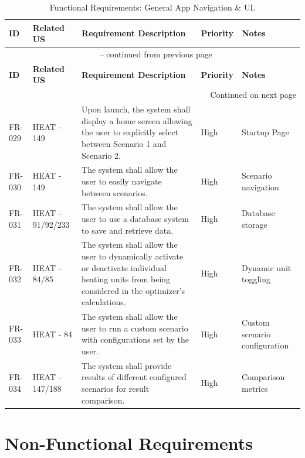 \begin{longtable}{|p{1.5cm}|p{2.4cm}|p{6.7cm}|p{1.4cm}|p{2cm}|}
\caption{Functional Requirements: General App Navigation \& UI.}
\label{tab:fr_general} \\
\hline
\textbf{ID} & \textbf{Related US} & \textbf{Requirement Description} & \textbf{Priority} & \textbf{Notes} \\
\hline
\endfirsthead

\multicolumn{5}{c}{{\tablename\ \thetable{} -- continued from previous page}} \\
\hline
\textbf{ID} & \textbf{Related US} & \textbf{Requirement Description} & \textbf{Priority} & \textbf{Notes} \\
\hline
\endhead

\hline \multicolumn{5}{|r|}{{Continued on next page}} \\ \hline
\endfoot

\hline
\endlastfoot

FR-029 & HEAT - 149 & Upon launch, the system shall display a home screen allowing the user to explicitly select between Scenario 1 and Scenario 2. & High & Startup Page \\
\hline
FR-030 & HEAT - 149 & The system shall allow the user to easily navigate between scenarios. & High & Scenario navigation \\
\hline
FR-031 & HEAT - 91/92/233 & The system shall allow the user to use a database system to save and retrieve data. & High & Database storage \\
\hline
FR-032 & HEAT - 84/85 & The system shall allow the user to dynamically activate or deactivate individual heating units from being considered in the optimizer’s calculations. & High & Dynamic unit toggling \\
\hline
FR-033 & HEAT - 84 & The system shall allow the user to run a custom scenario with configurations set by the user. & High & Custom scenario configuration \\
\hline
FR-034 & HEAT - 147/188 & The system shall provide results of different configured scenarios for result comparison. & High & Comparison metrics \\
\end{longtable}

\newpage
\section{Non-Functional Requirements}

